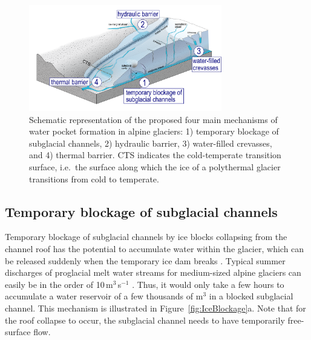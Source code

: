 \begin{figure}
    \centering
    \includegraphics[width=0.75\textwidth]{chapters/chapter_WPOFs/ReviewMechanisms.png}
    \caption{Schematic representation of the proposed four main mechanisms of water pocket formation in alpine glaciers: 1) temporary blockage of subglacial channels, 2) hydraulic barrier, 3) water-filled crevasses, and 4) thermal barrier. CTS indicates the cold-temperate transition surface, i.e.\ the surface along which the ice of a polythermal glacier transitions from cold to temperate.}
    \label{fig:general_concept}
\end{figure}


\subsection{ Temporary blockage of subglacial channels}
\label{sec:subglacialblocking}


Temporary blockage of subglacial channels by ice blocks collapsing from the channel roof has the potential to accumulate water within the glacier, which can be released suddenly when the temporary ice dam breaks \citep{Ballantyne&McGann1980,Rounce&al2017,Swift&al2021}. Typical summer discharges of proglacial melt water streams for medium-sized alpine glaciers can easily be in the order of 10\,m$^3$\,s$^{-1}$ \citep{Werder&al2010,Muller&al2024}. Thus, it would only take a few hours to accumulate a water reservoir of a few thousands of m$^3$ in a blocked subglacial channel. This mechanism is illustrated in Figure~\ref{fig:IceBlockage}a. Note that for the roof collapse to occur, the subglacial channel needs to have temporarily free-surface flow.

